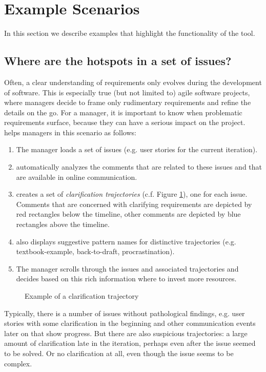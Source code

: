 \section{Example Scenarios}
In this section we describe examples that highlight the functionality of the \viss tool.

\subsection{Where are the hotspots in a set of issues?}
Often, a clear understanding of requirements only evolves during the development of software.
This is especially true (but not limited to) agile software projects, where managers decide to frame only rudimentary requirements and refine the details on the go.
For a manager, it is important to know when problematic requirements surface, because they can have a serious impact on the project.
\viss helps managers in this scenario as follows:
\begin{enumerate}
\item The manager loads a set of issues (e.g. user stories for the current iteration).
\item \viss automatically analyzes the comments that are related to these issues and that are available in online communication.  
\item \viss creates a set of \emph{clarification trajectories} (c.f. Figure \ref{fig:example-trajectory}), one for each issue. 
Comments that are concerned with clarifying requirements are depicted by red rectangles below the timeline, other comments are depicted by blue rectangles above the timeline.
\item \viss also displays suggestive pattern names for distinctive trajectories (e.g. textbook-example, back-to-draft, procrastination).
\item The manager scrolls through the issues and associated trajectories and decides based on this rich information where to invest more resources.
\end{enumerate}
\begin{figure}
\label{fig:example-trajectory}
\caption{Example of a clarification trajectory}
\end{figure}
Typically, there is a number of issues without pathological findings, e.g. user stories with some clarification in the beginning and other communication events later on that show progress. But there are also suspicious trajectories: a large amount of clarification late in the iteration, perhaps even after the issue seemed to be solved. 
Or no clarification at all, even though the issue seems to be complex.

